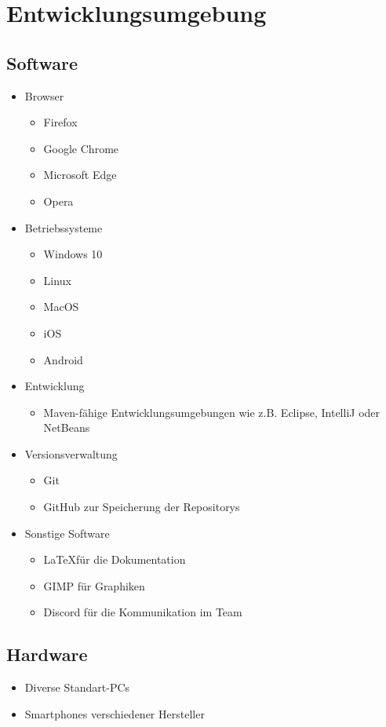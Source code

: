 \clearpage
\section{Entwicklungsumgebung}
\subsection{Software}
\begin{itemize}
    \item Browser
    \begin{itemize} [noitemsep]
        \item Firefox
        \item Google Chrome
        \item Microsoft Edge
        \item Opera
    \end{itemize} 
    \item Betriebssysteme
    \begin{itemize} [noitemsep]
        \item Windows 10
        \item Linux
        \item MacOS
        \item iOS
        \item Android
    \end{itemize}
    \item Entwicklung
    \begin{itemize} [noitemsep]
        \item \gls{Maven}-fähige Entwicklungsumgebungen wie z.B. \gls{Eclipse}, \gls{IntelliJ} oder \gls{NetBeans}
    \end{itemize}
    \item Versionsverwaltung
    \begin{itemize} [noitemsep]
        \item \gls{Git}
        \item \gls{GitHub} zur Speicherung der \glspl{Repository}
    \end{itemize}
    \item Sonstige Software
    \begin{itemize} [noitemsep]
        \item \LaTeX für die Dokumentation
        \item GIMP für Graphiken
        \item Discord für die Kommunikation im Team
    \end{itemize}
\end{itemize}
\subsection{Hardware}
\begin{itemize} [noitemsep]
    \item Diverse \glspl{Standart-PC}
    \item \glspl{Smartphone} verschiedener Hersteller
\end{itemize}